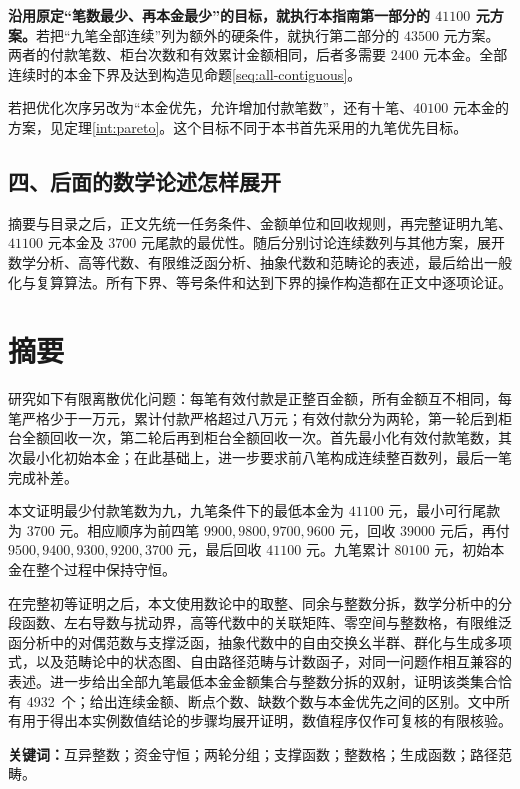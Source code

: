 \documentclass[UTF8,a4paper]{ctexbook}
\theoremstyle{definition}
\numberwithin{equation}{chapter}
\newcommand{\1}{\mathbf{1}}
\newcommand{\OptimalSetCount}{4932}
\begin{document}
\textbf{沿用原定“笔数最少、再本金最少”的目标，就执行本指南第一部分的 $41100$ 元方案。}若把“九笔全部连续”列为额外的硬条件，就执行第二部分的 $43500$ 元方案。两者的付款笔数、柜台次数和有效累计金额相同，后者多需要 $2400$ 元本金。全部连续时的本金下界及达到构造见命题\ref{seq:all-contiguous}。

若把优化次序另改为“本金优先，允许增加付款笔数”，还有十笔、$40100$ 元本金的方案，见定理\ref{int:pareto}。这个目标不同于本书首先采用的九笔优先目标。

\section*{四、后面的数学论述怎样展开}

摘要与目录之后，正文先统一任务条件、金额单位和回收规则，再完整证明九笔、$41100$ 元本金及 $3700$ 元尾款的最优性。随后分别讨论连续数列与其他方案，展开数学分析、高等代数、有限维泛函分析、抽象代数和范畴论的表述，最后给出一般化与复算算法。所有下界、等号条件和达到下界的操作构造都在正文中逐项论证。
\chapter*{摘要}
研究如下有限离散优化问题：每笔有效付款是正整百金额，所有金额互不相同，每笔严格少于一万元，累计付款严格超过八万元；有效付款分为两轮，第一轮后到柜台全额回收一次，第二轮后再到柜台全额回收一次。首先最小化有效付款笔数，其次最小化初始本金；在此基础上，进一步要求前八笔构成连续整百数列，最后一笔完成补差。

本文证明最少付款笔数为九，九笔条件下的最低本金为 $41100$ 元，最小可行尾款为 $3700$ 元。相应顺序为前四笔 $9900,9800,9700,9600$ 元，回收 $39000$ 元后，再付 $9500,9400,9300,9200,3700$ 元，最后回收 $41100$ 元。九笔累计 $80100$ 元，初始本金在整个过程中保持守恒。

在完整初等证明之后，本文使用数论中的取整、同余与整数分拆，数学分析中的分段函数、左右导数与扰动界，高等代数中的关联矩阵、零空间与整数格，有限维泛函分析中的对偶范数与支撑泛函，抽象代数中的自由交换幺半群、群化与生成多项式，以及范畴论中的状态图、自由路径范畴与计数函子，对同一问题作相互兼容的表述。进一步给出全部九笔最低本金金额集合与整数分拆的双射，证明该类集合恰有 \OptimalSetCount\ 个；给出连续金额、断点个数、缺数个数与本金优先之间的区别。文中所有用于得出本实例数值结论的步骤均展开证明，数值程序仅作可复核的有限核验。

\noindent\textbf{关键词：}互异整数；资金守恒；两轮分组；支撑函数；整数格；生成函数；路径范畴。

\tableofcontents
\mainmatter
\end{document}
